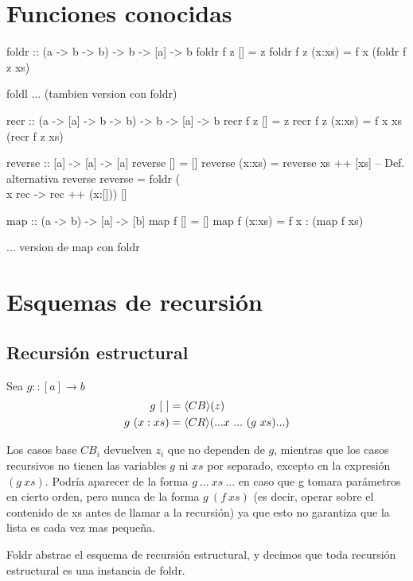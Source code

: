 \documentclass{article}
\begin{document}
\section{Funciones conocidas}


\begin{multicols}{2}
\begin{haskcode}
foldr :: (a -> b -> b) -> b -> [a] -> b
foldr f z [] = z
foldr f z (x:xs) = f x (foldr f z xs)
\end{haskcode}

\begin{haskcode}
foldl ... (tambien version con foldr)
\end{haskcode}

\begin{haskcode}
recr :: (a -> [a] -> b -> b) -> b -> [a] -> b
recr f z [] = z
recr f z (x:xs) = f x xs (recr f z xs)
\end{haskcode}

\begin{haskcode}
reverse :: [a] -> [a] -> [a]
reverse [] = []
reverse (x:xs) = reverse xs ++ [xs]
-- Def. alternativa reverse
reverse = foldr (\\x rec -> rec ++ (x:[])) [] 
\end{haskcode}

\begin{haskcode}
map :: (a -> b) -> [a] -> [b]
map f [] = []
map f (x:xs) = f x : (map f xs)
\end{haskcode}

\begin{haskcode}
... version de map con foldr
\end{haskcode}



\end{multicols}

\section{Esquemas de recursión}
\subsection{Recursión estructural}
Sea $g :: [a] \to b$
\begin{align}
g \ [\ ] &= \langle CB\rangle(z) \\
g\ (x:xs) &= \langle CR\rangle(... x\ ...\ (g\ xs) ...)
\end{align}

Los casos base $CB_i$ devuelven $z_i$ que no dependen de $g$, mientras que los casos recursivos no tienen las variables $g$ ni $xs$ por separado, excepto en la expresión $(g\ xs)$.
Podría aparecer de la forma $g\ ...\ xs\ ...$ en caso que g tomara parámetros en cierto orden, pero nunca de la forma $g\ (f \ xs)$ (es decir, operar sobre el contenido de xs antes de llamar a la recursión) ya que esto no garantiza que la lista es cada vez mas pequeña.
\par\noindent
Foldr abstrae el esquema de recursión estructural, y decimos que toda recursión estructural es una instancia de foldr.
\end{document}
